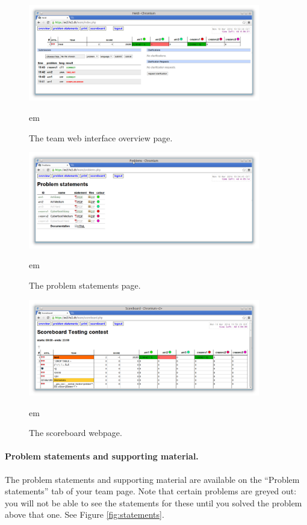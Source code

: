 \begin{figure}[t]
\begin{center}
\includegraphics[width=0.9\textwidth]{overview.png}
\end{center}
 em
\caption{The team web interface overview page.}
\label{fig:overview}

\begin{center}
\includegraphics[width=0.9\textwidth]{statements.png}
\end{center}
 em
\caption{The problem statements page.}
\label{fig:statements}

\begin{center}
\includegraphics[width=0.9\textwidth]{ranking.png}
\end{center}
 em
\caption{The scoreboard webpage.}
\label{fig:ranking}
\end{figure}


\paragraph{Problem statements and supporting material.}
The problem statements and supporting material are available
on the ``Problem statements'' tab of your team page.
Note that certain problems are greyed out: you will not be
able to see the statements for these until you solved
the problem above that one.
See Figure \ref{fig:statements}.

